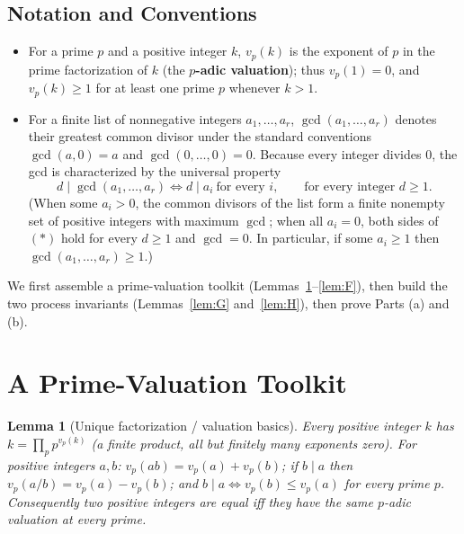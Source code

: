 \documentclass[11pt]{article}
\theoremstyle{plain}
\newtheorem{lemma}{Lemma}
\theoremstyle{definition}
\theoremstyle{remark}
\begin{document}
\subsection*{Notation and Conventions}

\begin{itemize}
\item For a prime $p$ and a positive integer $k$, $v_p(k)$ is the exponent of
$p$ in the prime factorization of $k$ (the \textbf{$p$-adic valuation}); thus
$v_p(1)=0$, and $v_p(k) \ge 1$ for at least one prime $p$ whenever $k>1$.

\item For a finite list of nonnegative integers $a_1,\dots,a_r$,
$\gcd(a_1,\dots,a_r)$ denotes their greatest common divisor under the standard
conventions $\gcd(a,0)=a$ and $\gcd(0,\dots,0)=0$. Because every integer
divides $0$, the gcd is characterized by the universal property
\begin{equation*}
d \mid \gcd(a_1,\dots,a_r)\iff d\mid a_i\ \text{for every } i,
\qquad \text{for every integer } d\ge 1. \tag{$\ast$}
\end{equation*}
(When some $a_i>0$, the common divisors of the list form a finite nonempty set
of positive integers with maximum $\gcd$; when all $a_i=0$, both sides of
$(\ast)$ hold for every $d\ge1$ and $\gcd=0$. In particular, if some $a_i \ge 1$
then $\gcd(a_1,\dots,a_r) \ge 1$.)
\end{itemize}

We first assemble a prime-valuation toolkit (Lemmas~\ref{lem:A}--\ref{lem:F}),
then build the two process invariants (Lemmas~\ref{lem:G} and~\ref{lem:H}),
then prove Parts (a) and (b).

\section{A Prime-Valuation Toolkit}

\begin{lemma}[Unique factorization / valuation basics]\label{lem:A}
Every positive integer $k$ has $k = \prod_p p^{v_p(k)}$ (a finite product, all
but finitely many exponents zero). For positive integers $a,b$:
$v_p(ab)=v_p(a)+v_p(b)$; if $b\mid a$ then $v_p(a/b)=v_p(a)-v_p(b)$; and
$b \mid a \iff v_p(b)\le v_p(a)$ for every prime $p$. Consequently two positive
integers are equal iff they have the same $p$-adic valuation at every prime.
\end{lemma}
\end{document}
